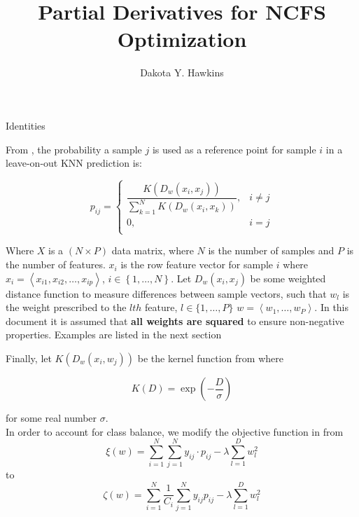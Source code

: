\documentclass[12pt, a4paper]{article}
\title{Partial Derivatives for NCFS Optimization}
\author{Dakota Y. Hawkins}
\begin{document}
\maketitle


\begin{section}{Identities}

    From \cite{Yang2012}, the probability a sample $j$ is used as a reference
    point for sample $i$ in a leave-on-out KNN prediction is:

    \begin{equation}\label{pij}
        p_{ij} =
            \begin{cases*}
            \dfrac{K(D_w(x_i, x_j))}
                       {\sum \limits_{k = 1}^N K(D_w(x_i, x_k))}, &i \neq j \\
            0, &i = j \\
            \end{cases*}
    \end{equation}

    Where $X$ is a $(N \times P)$ data matrix, where $N$ is the number of samples and
    $P$ is the number of features. $x_i$ is the row feature vector for sample
    $i$ where $x_i = \left < x_{i1}, x_{i2}, \ldots, x_{ip} \right >$,
    $i \in \left \{1, \ldots, N \right \}$. Let $D_w(x_i, x_j)$ be some weighted distance
    function to measure differences between sample vectors, such that $w_l$ is
    the weight prescribed to the $lth$ feature, $l \in \{1, \ldots, P\}$
    $w = \left < w_1, \ldots, w_P \right >$. In this document it is assumed
    that \textbf{all weights are squared} to ensure non-negative properties.
    Examples are listed in the next section

    Finally, let $K(D_w(x_i, w_j))$ be the kernel function from \cite{Yang2012}
    where

    \begin{equation}
        K(D) = \exp{ \left ( - \dfrac{D}{\sigma} \right )}
    \end{equation}

    for some real number $\sigma$. \\
    
    In order to account for class balance, we modify the objective function in
    \cite{Yang2012} from
    \begin{equation}
    \xi (w) = \sum \limits_{i=1}^N \sum \limits_{j=1}^N y_{ij} \cdot p_{ij}
              - \lambda \sum \limits_{l=1}^D w_l^2
    \end{equation}
    to
    \begin{equation}
    \zeta (w) = \sum \limits_{i = 1}^N \dfrac{1}{C_i}
                \sum \limits_{j = 1}^N y_{ij} p_{ij}
                - \lambda \sum \limits_{l=1}^D w_l^2
    \end{equation}


\end{section}
\end{document}
